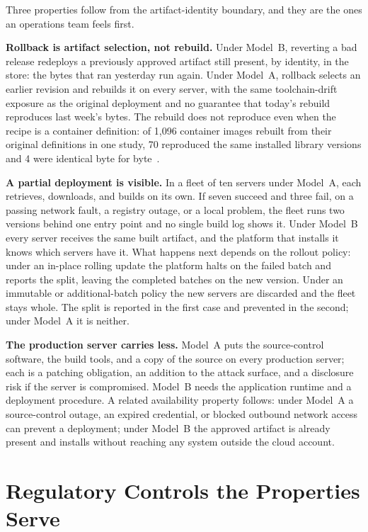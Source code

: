 \documentclass[11pt]{article}
\begin{document}
Three properties follow from the artifact-identity boundary, and they are the ones an operations team feels first.

\textbf{Rollback is artifact selection, not rebuild.} Under Model~B, reverting a bad release redeploys a previously approved artifact still present, by identity, in the store: the bytes that ran yesterday run again. Under Model~A, rollback selects an earlier revision and rebuilds it on every server, with the same toolchain-drift exposure as the original deployment and no guarantee that today's rebuild reproduces last week's bytes. The rebuild does not reproduce even when the recipe is a container definition: of 1{,}096 container images rebuilt from their original definitions in one study, 70 reproduced the same installed library versions and 4 were identical byte for byte~\cite{DockerRepro}.

\textbf{A partial deployment is visible.} In a fleet of ten servers under Model~A, each retrieves, downloads, and builds on its own. If seven succeed and three fail, on a passing network fault, a registry outage, or a local problem, the fleet runs two versions behind one entry point and no single build log shows it. Under Model~B every server receives the same built artifact, and the platform that installs it knows which servers have it. What happens next depends on the rollout policy: under an in-place rolling update the platform halts on the failed batch and reports the split, leaving the completed batches on the new version. Under an immutable or additional-batch policy the new servers are discarded and the fleet stays whole. The split is reported in the first case and prevented in the second; under Model~A it is neither.

\textbf{The production server carries less.} Model~A puts the source-control software, the build tools, and a copy of the source on every production server; each is a patching obligation, an addition to the attack surface, and a disclosure risk if the server is compromised. Model~B needs the application runtime and a deployment procedure. A related availability property follows: under Model~A a source-control outage, an expired credential, or blocked outbound network access can prevent a deployment; under Model~B the approved artifact is already present and installs without reaching any system outside the cloud account.

\section{Regulatory Controls the Properties Serve}
\end{document}
